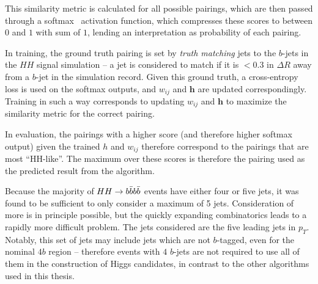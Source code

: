 This similarity metric is calculated for all possible pairings, which are then passed through a 
softmax~\cite{Softmax} activation function, which compresses these scores to between $0$ and $1$ 
with sum of $1$, lending an interpretation as probability of each pairing.

In training, the ground truth pairing is set by \emph{truth matching} jets to the $b$-jets 
in the $HH$ signal simulation -- a jet is considered to match if it is $< 0.3$ in $\Delta R$
away from a $b$-jet in the simulation record. Given this ground truth, a cross-entropy loss 
is used on the softmax outputs, and $w_{ij}$ and $\mathbf{h}$ are updated correspondingly.
Training in such a way corresponds to updating $w_{ij}$ and $\mathbf{h}$ to maximize the similarity 
metric for the correct pairing.

In evaluation, the pairings with a higher score (and therefore higher softmax output) given 
the trained $h$ and $w_{ij}$ therefore correspond to the pairings that are most ``HH-like''. 
The maximum over these scores is therefore the pairing used as the predicted result from 
the algorithm.

Because the majority of $HH\rightarrow b\bar{b}b\bar{b}$ events have either four or five jets, it was 
found to be sufficient to only consider a maximum of 5 jets. Consideration of more is in 
principle possible, but the quickly expanding combinatorics leads to a rapidly more 
difficult problem. The jets considered are the five leading jets in $p_{T}$. Notably, 
this set of jets may include jets which are not $b$-tagged, even for the nominal $4b$ 
region -- therefore events with $4$ $b$-jets are not required to use all of them 
in the construction of Higgs candidates, in contrast to the other algorithms used in this 
thesis.

